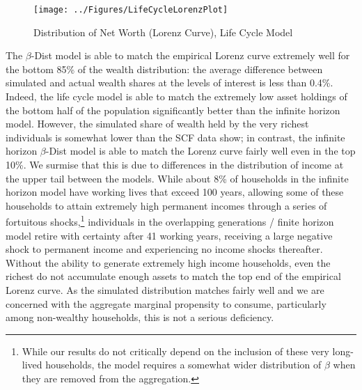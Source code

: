 \documentclass{econtex}\usepackage{graphicx} \usepackage{hyperref} \usepackage{ushort}
\newcommand{\Discount}{\ensuremath{\beta}}
\begin{document}
\begin{figure}
\caption{Distribution of Net Worth (Lorenz Curve), Life Cycle Model}
\label{fig:LorenzLifeCycle}
\begin{center}
\texttt{[image: ../Figures/LifeCycleLorenzPlot]}
\end{center}
\end{figure}

The \Discount-Dist model is able to match the empirical Lorenz curve extremely well for the bottom 85\% of the wealth distribution: the average difference between simulated and actual wealth shares at the levels of interest is less than 0.4\%.  Indeed, the life cycle model is able to match the extremely low asset holdings of the bottom half of the population significantly better than the infinite horizon model.  However, the simulated share of wealth held by the very richest individuals is somewhat lower than the SCF data show; in contrast, the infinite horizon \Discount-Dist model is able to match the Lorenz curve fairly well even in the top 10\%.  We surmise that this is due to differences in the distribution of income at the upper tail between the models.  While about 8\% of households in the infinite horizon model have working lives that exceed 100 years, allowing some of these households to attain extremely high permanent incomes through a series of fortuitous shocks,\footnote{While our results do not critically depend on the inclusion of these very long-lived households, the model requires a somewhat wider distribution of $\Discount$ when they are removed from the aggregation.} individuals in the overlapping generations / finite horizon model retire with certainty after 41 working years, receiving a large negative shock to permanent income and experiencing no income shocks thereafter.  Without the ability to generate extremely high income households, even the richest do not accumulate enough assets to match the top end of the empirical Lorenz curve.  As the simulated distribution matches fairly well and we are concerned with the aggregate marginal propensity to consume, particularly among non-wealthy households, this is not a serious deficiency.
\end{document}
